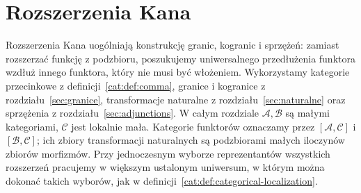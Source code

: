 \section{Rozszerzenia Kana}\label{cat:sec:kan-extensions}
Rozszerzenia Kana uogólniają konstrukcję granic, kogranic i sprzężeń: zamiast rozszerzać funkcję z podzbioru, poszukujemy uniwersalnego przedłużenia funktora wzdłuż innego funktora, który nie musi być włożeniem. Wykorzystamy kategorie przecinkowe z definicji~\ref{cat:def:comma}, granice i kogranice z rozdziału~\ref{sec:granice}, transformacje naturalne z rozdziału~\ref{sec:naturalne} oraz sprzężenia z rozdziału~\ref{sec:adjunctions}. W całym rozdziale $\mathcal A,\mathcal B$ są małymi kategoriami, $\mathcal C$ jest lokalnie mała. Kategorie funktorów oznaczamy przez $[\mathcal A,\mathcal C]$ i $[\mathcal B,\mathcal C]$; ich zbiory transformacji naturalnych są podzbiorami małych iloczynów zbiorów morfizmów. Przy jednoczesnym wyborze reprezentantów wszystkich rozszerzeń pracujemy w większym ustalonym uniwersum, w którym można dokonać takich wyborów, jak w definicji~\ref{cat:def:categorical-localization}.

